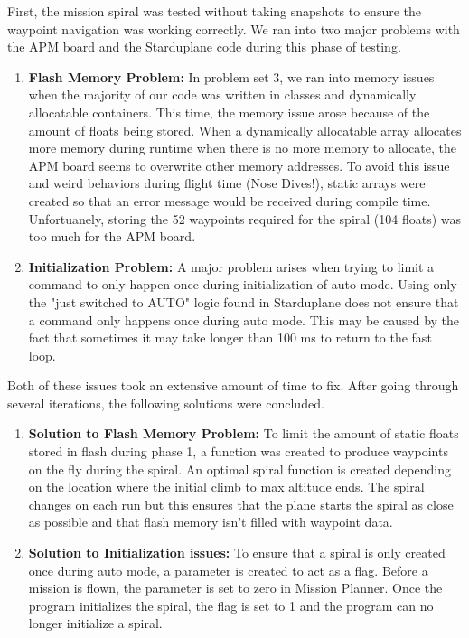 \documentclass[11pt]{article}
\begin{document}
	First, the mission spiral was tested without taking snapshots to ensure the waypoint navigation was working correctly. We ran into two major problems with the APM board and the Starduplane code during this phase of testing.
	\begin{enumerate}
		\item \textbf{Flash Memory Problem:} In problem set 3, we ran into memory issues when the majority of our code was written in classes and dynamically allocatable containers. This time, the memory issue arose because of the amount of floats being stored. When a dynamically allocatable array allocates more memory during runtime when there is no more memory to allocate, the APM board seems to overwrite other memory addresses. To avoid this issue and weird behaviors during flight time (Nose Dives!), static arrays were created so that an error message would be received during compile time. Unfortuanely, storing the 52 waypoints required for the spiral (104 floats) was too much for the APM board.
		\item \textbf{Initialization Problem:} A major problem arises when trying to limit a command to only happen once during initialization of auto mode. Using only the "just switched to AUTO" logic found in Starduplane does not ensure that a command only happens once during auto mode. This may be caused by the fact that sometimes it may take longer than 100 ms to return to the fast loop.
	\end{enumerate}

	Both of these issues took an extensive amount of time to fix. After going through several iterations, the following solutions were concluded.
	\begin{enumerate}
		\item \textbf{Solution to Flash Memory Problem:} To limit the amount of static floats stored in flash during phase 1, a function was created to produce waypoints on the fly during the spiral. An optimal spiral function is created depending on the location where the initial climb to max altitude ends. The spiral changes on each run but this ensures that the plane starts the spiral as close as possible and that flash memory isn't filled with waypoint data.
		\item \textbf{Solution to Initialization issues:} To ensure that a spiral is only created once during auto mode, a parameter is created to act as a flag. Before a mission is flown, the parameter is set to zero in Mission Planner. Once the program initializes the spiral, the flag is set to 1 and the program can no longer initialize a spiral.
	\end{enumerate}
\end{document}
